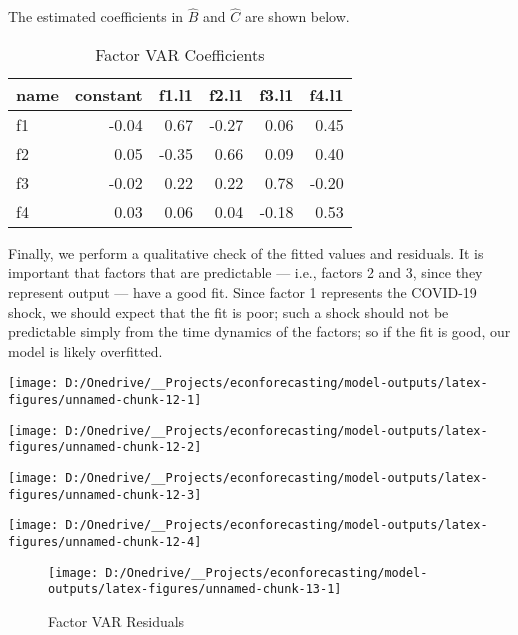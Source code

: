 \documentclass[11pt, letterpaper]{article}\usepackage[]{graphicx}\usepackage[]{color}
\begin{document}
The estimated coefficients in $\widehat{B}$ and $\widehat{C}$ are shown below.
\begin{table}[H]
\centering
\begingroup\footnotesize
\begin{tabular}{lrrrrr}
  \hline
name & constant & f1.l1 & f2.l1 & f3.l1 & f4.l1 \\ 
  \hline
f1 & -0.04 & 0.67 & -0.27 & 0.06 & 0.45 \\ 
  f2 & 0.05 & -0.35 & 0.66 & 0.09 & 0.40 \\ 
  f3 & -0.02 & 0.22 & 0.22 & 0.78 & -0.20 \\ 
  f4 & 0.03 & 0.06 & 0.04 & -0.18 & 0.53 \\ 
   \hline
\end{tabular}
\endgroup
\caption{Factor VAR Coefficients} 
\end{table}



Finally, we perform a qualitative check of the fitted values and residuals. It is important that factors that are predictable --- i.e., factors 2 and 3, since they represent output --- have a good fit. Since factor 1 represents the COVID-19 shock, we should expect that the fit is poor; such a shock should not be predictable simply from the time dynamics of the factors; so if the fit is good, our model is likely overfitted.


{\centering \texttt{[image: D:/Onedrive/\_\_Projects/econforecasting/model-outputs/latex-figures/unnamed-chunk-12-1]} 

}




{\centering \texttt{[image: D:/Onedrive/\_\_Projects/econforecasting/model-outputs/latex-figures/unnamed-chunk-12-2]} 

}




{\centering \texttt{[image: D:/Onedrive/\_\_Projects/econforecasting/model-outputs/latex-figures/unnamed-chunk-12-3]} 

}




{\centering \texttt{[image: D:/Onedrive/\_\_Projects/econforecasting/model-outputs/latex-figures/unnamed-chunk-12-4]} 

}





\begin{figure}[H]

{\centering \texttt{[image: D:/Onedrive/\_\_Projects/econforecasting/model-outputs/latex-figures/unnamed-chunk-13-1]} 

}

\caption[Factor VAR Residuals]{Factor VAR Residuals}\label{fig:unnamed-chunk-13}
\end{figure}
\end{document}
